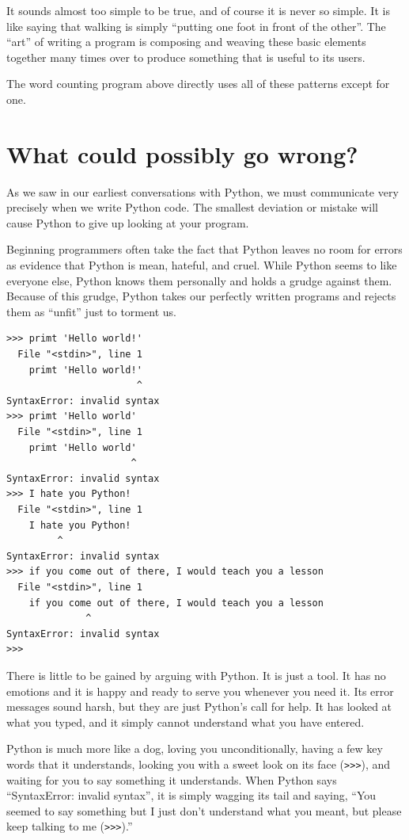 It sounds almost too simple to be true, and of course it is never
so simple.  It is like saying that walking is simply
``putting one foot in front of the other''.  The ``art'' 
of writing a program is composing and weaving these
basic elements together many times over to produce something
that is useful to its users.

The word counting program above directly uses all of 
these patterns except for one.

\section{What could possibly go wrong?}

As we saw in our earliest conversations with Python, we must
communicate very precisely when we write Python code.  The smallest
deviation or mistake will cause Python to give up looking at your
program.

Beginning programmers often take the fact that Python leaves no
room for errors as evidence that Python is mean, hateful, and cruel.
While Python seems to like everyone else, Python knows them 
personally and holds a grudge against them.  Because of this grudge,
Python takes our perfectly written programs and rejects them as 
``unfit'' just to torment us.

\beforeverb
\begin{verbatim}
>>> primt 'Hello world!'
  File "<stdin>", line 1
    primt 'Hello world!'
                       ^
SyntaxError: invalid syntax
>>> primt 'Hello world'
  File "<stdin>", line 1
    primt 'Hello world'
                      ^
SyntaxError: invalid syntax
>>> I hate you Python!
  File "<stdin>", line 1
    I hate you Python!
         ^
SyntaxError: invalid syntax
>>> if you come out of there, I would teach you a lesson
  File "<stdin>", line 1
    if you come out of there, I would teach you a lesson
              ^
SyntaxError: invalid syntax
>>> 
\end{verbatim}
\afterverb
%
There is little to be gained by arguing with Python.  It is just a tool.
It has no emotions and it is happy and ready to serve you whenever you
need it.  Its error messages sound harsh, but they are just Python's
call for help.  It has looked at what you typed, and it simply cannot
understand what you have entered.

Python is much more like a dog, loving you unconditionally, having a few
key words that it understands, looking you with a sweet look on its
face ({\tt >>>}), and waiting for you to say something it understands.
When Python says ``SyntaxError: invalid syntax'', it is simply wagging
its tail and saying, ``You seemed to say something but I just don't
understand what you meant, but please keep talking to me ({\tt >>>}).''

